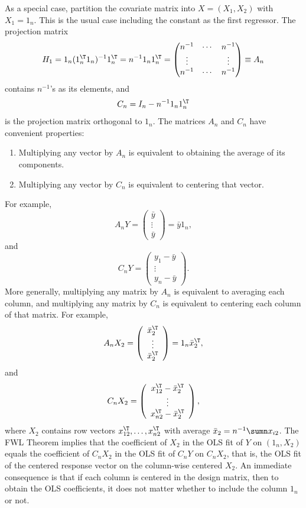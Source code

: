 As a special case, partition the covariate matrix into $X=(X_1,X_2)$ with  $X_{1}=1_{n}$. This is the usual case including the constant as the first regressor.   
The projection matrix 
\[
H_{1}=1_{n}(1_{n}^{\T}1_{n})^{-1}1_{n}^{\T} 
=n^{-1}1_{n}1_{n}^{\T} = \begin{pmatrix}
n^{-1} & \cdots & n^{-1} \\
\vdots && \vdots \\
n^{-1} &\cdots & n^{-1} 
\end{pmatrix} \equiv A_n
\]
 contains $n^{-1}$'s as its elements, and 
 $$
 C_{n}=I_{n}-n^{-1}1_{n}1_{n}^{\T}
 $$
is the projection matrix orthogonal to $1_{n}$. 
The matrices $A_n$ and $C_n$ have convenient properties:
\begin{enumerate}[label=(P\arabic*), ref=P\arabic*]
\item
Multiplying any vector by $A_n$ is equivalent to obtaining the average of its components.
\item
Multiplying any vector 
by $C_{n}$ is equivalent to centering that vector.
\end{enumerate}
For example, 
\[
A_n Y = \left(\begin{array}{c}
 \bar{y}\\
\vdots\\
 \bar{y}
\end{array}\right) =  \bar{y} 1_n ,
\]
and
\[
C_{n}Y=\left(\begin{array}{c}
y_{1}-\bar{y}\\
\vdots\\
y_{n}-\bar{y}
\end{array}\right).
\]
More generally, multiplying any matrix by $A_n$ is equivalent to averaging each column, and multiplying any matrix by $C_{n}$ is equivalent to centering each
column of that matrix. For example,
\[
A_n X_2 = \left(\begin{array}{c}
 \bar{x}_{2}^{\T}\\
\vdots\\
 \bar{x}_{2}^{\T}
\end{array}\right) = 1_n  \bar{x}_{2}^{\T} , 
\]
and
\[
C_{n}X_{2}=\left(\begin{array}{c}
x_{12}^{\T}-\bar{x}_{2}^{\T}\\
\vdots\\
x_{n2}^{\T}-\bar{x}_{2}^{\T}
\end{array}\right),
\]
where $X_{2}$ contains row vectors $x_{12}^{\T},\ldots,x_{n2}^{\T}$ with average $\bar{x}_2 = n^{-1} \sumn x_{i2}$. The FWL Theorem implies that the coefficient of $X_2$ in the OLS fit of $Y$ on $(1_{n},X_{2})$ equals the coefficient of $C_{n}X_{2}$ 
 in the OLS fit of $C_{n}Y$ on $C_{n}X_{2}$,
that is, the OLS fit of the centered response vector on the column-wise
centered $X_{2}.$ An immediate consequence is that if each column is centered in the design matrix, then to obtain the OLS coefficients, it does not matter whether to
include the column $1_{n}$ or not. 

